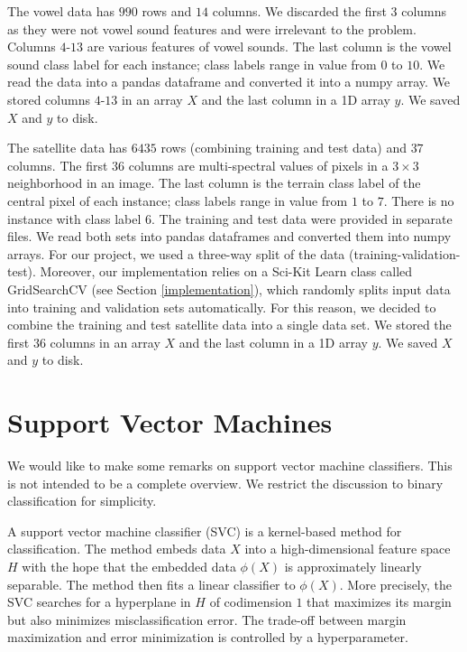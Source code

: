 \documentclass[12pt]{article}
\begin{document}
The vowel data has $990$ rows and $14$ columns. We discarded the first $3$ columns as they were not vowel sound features and were irrelevant to the problem. Columns $4$-$13$ are various features of vowel sounds. The last column is the vowel sound class label for each instance; class labels range in value from $0$ to $10$. We read the data into a pandas dataframe and converted it into a numpy array. We stored columns $4$-$13$ in an array $X$ and the last column in a 1D array $y$. We saved $X$ and $y$ to disk.

The satellite data has $6435$ rows (combining training and test data) and $37$ columns. The first $36$ columns are multi-spectral values of pixels in a $3\times 3$ neighborhood in an image. The last column is the terrain class label of the central pixel of each instance; class labels range in value from $1$ to $7$. There is no instance with class label $6$. The training and test data were provided in separate files. We read both sets into pandas dataframes and converted them into numpy arrays. For our project, we used a three-way split of the data (training-validation-test). Moreover, our implementation relies on a Sci-Kit Learn class called GridSearchCV (see Section \ref{implementation}), which randomly splits input data into training and validation sets automatically. For this reason, we decided to combine the training and test satellite data into a single data set. We stored the first $36$ columns in an array $X$ and the last column in a 1D array $y$. We saved $X$ and $y$ to disk.


\section{Support Vector Machines}

We would like to make some remarks on support vector machine classifiers. This is not intended to be a complete overview. We restrict the discussion to binary classification for simplicity.

A support vector machine classifier (SVC) is a kernel-based method for classification. The method embeds data $X$ into a high-dimensional feature space $H$ with the hope that the embedded data $\phi(X)$ is approximately linearly separable. The method then fits a linear classifier to $\phi(X)$. More precisely, the SVC searches for a hyperplane in $H$ of codimension $1$ that maximizes its margin but also minimizes misclassification error. The trade-off between margin maximization and error minimization is controlled by a hyperparameter.
\end{document}
